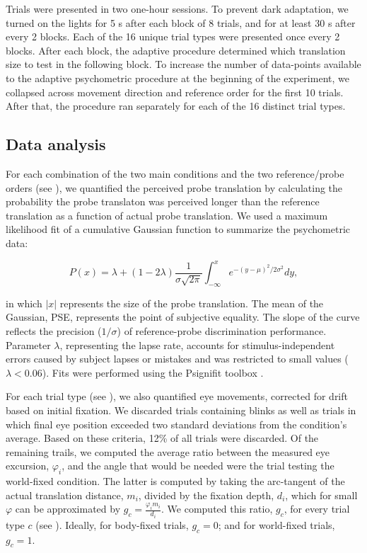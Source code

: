 Trials were presented in two one-hour sessions. To prevent dark adaptation, we turned on the lights for 5 \si{\second} after each block of 8 trials, and for at least 30 s after every 2 blocks. Each of the 16 unique trial types were presented once every 2 blocks. After each block, the adaptive procedure determined which translation size to test in the following block. To increase the number of data-points available to the adaptive psychometric procedure at the beginning of the experiment, we collapsed across movement direction and reference order for the first 10 trials. After that, the procedure ran separately for each of the 16 distinct trial types.

\subsection{Data analysis}

For each combination of the two main conditions and the two reference/probe orders (see ), we quantified the perceived probe translation by calculating the probability the probe translaton was perceived longer than the reference translation as a function of actual probe translation. We used a maximum likelihood fit of a cumulative Gaussian function to summarize the psychometric data:

\begin{equation}
\label{p4:eq1}
P(x) = \lambda + (1 - 2\lambda) \frac{1}{\sigma \sqrt{2\pi}} \int_{-\infty}^{x}{e^{-(y-\mu)^2 / 2\sigma^2}}dy,
\end{equation}

in which $|x|$ represents the size of the probe translation. The mean of the Gaussian, PSE, represents the point of subjective equality. The slope of the curve reflects the precision ($1/\sigma$) of reference-probe discrimination performance. Parameter $\lambda$, representing the lapse rate, accounts for stimulus-independent errors caused by subject lapses or mistakes and was restricted to small values ($\lambda < 0.06$). Fits were performed using the Psignifit toolbox \cite{wichmann2001,wichmann2001b}.

For each trial type (see ), we also quantified eye movements, corrected for drift based on initial fixation. We discarded trials containing blinks as well as trials in which final eye position exceeded two standard deviations from the condition's average. Based on these criteria, 12\% of all trials were discarded. Of the remaining trails, we computed the average ratio between the measured eye excursion, $\varphi_i$, and the angle that would be needed were the trial testing the world-fixed condition. The latter is computed by taking the arc-tangent of the actual translation distance, $m_i$, divided by the fixation depth, $d_i$, which for small $\varphi$ can be approximated by $g_c = \frac{\varphi_i m_i}{d_i}$. We computed this ratio, $g_c$, for every trial type $c$ (see ). Ideally, for body-fixed trials, $g_c = 0$; and for world-fixed trials, $g_c = 1$.


